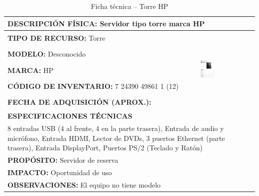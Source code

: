 \begin{table}[H]
\centering
\caption{Ficha técnica -- Torre HP}
\label{tab:torre-hp-1}
\begin{tabular}{|p{}|p{}|}
\hline
\multicolumn{2}{|l|}{\textbf{DESCRIPCIÓN FÍSICA:} Servidor tipo torre marca HP} \\ \hline
\textbf{TIPO DE RECURSO:} Torre & 
\multirow{5}{*}{\includegraphics[width=0.25\textwidth,height=4cm,keepaspectratio]{tablas-images/cp1/torres/torre-1.png}} \\ \cline{1-1}
\textbf{MODELO:} Desconocido & \\ \cline{1-1}
\textbf{MARCA:} HP & \\ \cline{1-1}
\textbf{CÓDIGO DE INVENTARIO:} 7 24390 49861 1 (12) & \\ \cline{1-1}
\textbf{FECHA DE ADQUISICIÓN (APROX.):} & \\ \hline
\multicolumn{2}{|l|}{\textbf{ESPECIFICACIONES TÉCNICAS}} \\ \hline
\multicolumn{2}{|p{0.95\textwidth}|}{
\footnotesize
8 entradas USB (4 al frente, 4 en la parte trasera), Entrada de audio y micrófono, Entrada HDMI, Lector de DVDs, 3 puertos Ethernet (parte trasera), Entrada DisplayPort, Puertos PS/2 (Teclado y Ratón)
} \\ \hline
\multicolumn{2}{|l|}{\textbf{PROPÓSITO:} Servidor de reserva} \\ \hline
\multicolumn{2}{|l|}{\textbf{IMPACTO:} Oportunidad de uso} \\ \hline
\multicolumn{2}{|l|}{\textbf{OBSERVACIONES:} El equipo no tiene modelo} \\ \hline
\end{tabular}
\end{table}

